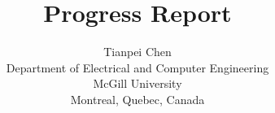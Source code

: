 \documentclass[12pt, draftclsnofoot, onecolumn]{IEEEtran}
\begin{document}
%
\title{Progress Report}
%
%
%


\author{Tianpei Chen\\
Department of Electrical and Computer Engineering\\
McGill University\\
Montreal, Quebec, Canada}

% 
%
\end{document}
